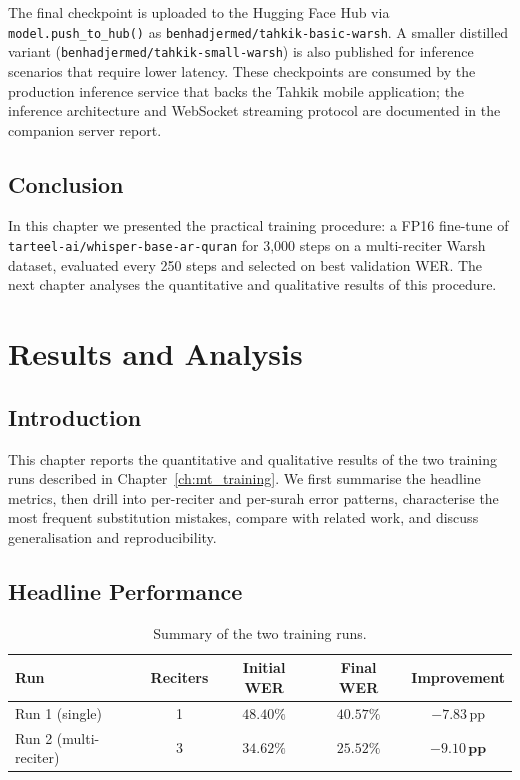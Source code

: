 The final checkpoint is uploaded to the Hugging Face Hub via
\texttt{model.push\_to\_hub()} as \texttt{benhadjermed/tahkik-basic-warsh}.
A smaller distilled variant (\texttt{benhadjermed/tahkik-small-warsh}) is
also published for inference scenarios that require lower latency.
These checkpoints are consumed by the production inference service that
backs the Tahkik mobile application; the inference architecture and
WebSocket streaming protocol are documented in the companion server
report.

\section{Conclusion}
In this chapter we presented the practical training procedure: a
FP16 fine-tune of \texttt{tarteel-ai/whisper-base-ar-quran} for
3{,}000 steps on a multi-reciter Warsh dataset, evaluated every 250
steps and selected on best validation WER. The next chapter analyses
the quantitative and qualitative results of this procedure.

\chapter{Results and Analysis}
\label{ch:mt_results}

\section{Introduction}
This chapter reports the quantitative and qualitative results of the two
training runs described in Chapter~\ref{ch:mt_training}. We first
summarise the headline metrics, then drill into per-reciter and
per-surah error patterns, characterise the most frequent substitution
mistakes, compare with related work, and discuss generalisation and
reproducibility.

\section{Headline Performance}

\begin{table}[H]
  \centering
  \caption{Summary of the two training runs.}
  \label{tab:mt_headline}
  \renewcommand{\arraystretch}{1.35}
  \begin{tabular}{lcccc}
    \toprule
    \textbf{Run} & \textbf{Reciters} & \textbf{Initial WER} & \textbf{Final WER} & \textbf{Improvement} \\
    \midrule
    Run 1 (single)        & 1   & $48.40\%$ & $40.57\%$ & $-7.83$\,pp \\
    Run 2 (multi-reciter) & 3   & $34.62\%$ & $\mathbf{25.52\%}$ & $\mathbf{-9.10\,pp}$ \\
    \bottomrule
  \end{tabular}
\end{table}

